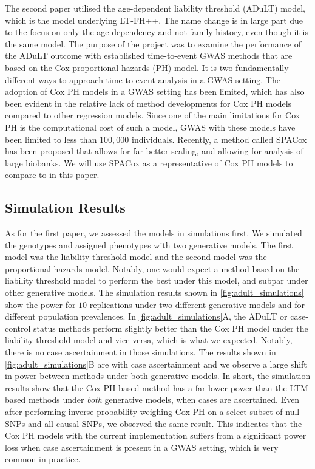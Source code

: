 The second paper utilised the age-dependent liability threshold (ADuLT) model, which is the model underlying LT-FH++. The name change is in large part due to the focus on only the age-dependency and not family history, even though it is the same model. The purpose of the project was to examine the performance of the ADuLT outcome with established time-to-event GWAS methods that are based on the Cox proportional hazards (PH) model. It is two fundamentally different ways to approach time-to-event analysis in a GWAS setting. The adoption of Cox PH models in a GWAS setting has been limited, which has also been evident in the relative lack of method developments for Cox PH models compared to other regression models. Since one of the main limitations for Cox PH is the computational cost of such a model, GWAS with these models have been limited to less than $ 100,000 $ individuals. Recently, a method called SPACox \cite{bi2020fast} has been proposed that allows for far better scaling, and allowing for analysis of large biobanks. We will use SPACox as a representative of Cox PH models to compare to in this paper.

\subsection{Simulation Results}

As for the first paper, we assessed the models in simulations first. We simulated the genotypes and assigned phenotypes with two generative models. The first model was the liability threshold model and the second model was the proportional hazards model. Notably, one would expect a method based on the liability threshold model to perform the best under this model, and subpar under other generative models. The simulation results shown in \cref{fig:adult_simulations} show the power for $ 10 $ replications under two different generative models and for different population prevalences. In \cref{fig:adult_simulations}A, the ADuLT or case-control status methods perform slightly better than the Cox PH model under the liability threshold model and vice versa, which is what we expected. Notably, there is no case ascertainment in those simulations. The results shown in \cref{fig:adult_simulations}B are with case ascertainment and we observe a large shift in power between methods under both generative models. In short, the simulation results show that the Cox PH based method has a far lower power than the LTM based methods under \textit{both} generative models, when cases are ascertained. Even after performing inverse probability weighing Cox PH on a select subset of null SNPs and all causal SNPs, we observed the same result. This indicates that the Cox PH models with the current implementation suffers from a significant power loss when case ascertainment is present in a GWAS setting, which is very common in practice.

